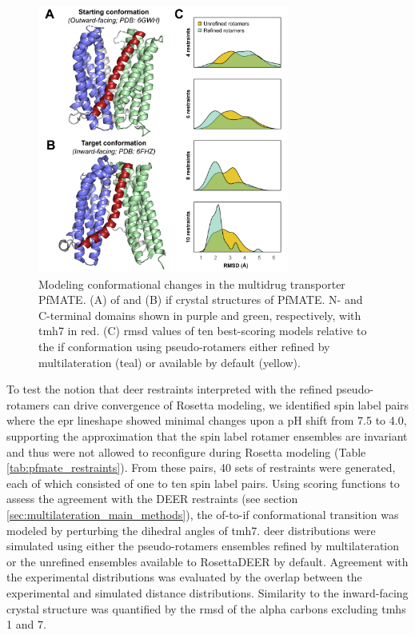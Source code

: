 \begin{figure}
\centering
\includegraphics[width=3.25in]{Figures/multilateration_main_rmsd.pdf}
 \caption[Modeling conformational changes in the multidrug transporter PfMATE.]{Modeling conformational changes in the multidrug transporter PfMATE. (A) \Gls{of} and (B) \gls{if} crystal structures of PfMATE. N- and C-terminal domains shown in purple and green, respectively, with \gls{tmh}7 in red. (C) \Gls{rmsd} values of ten best-scoring models relative to the \gls{if} conformation using pseudo-rotamers either refined by multilateration (teal) or available by default (yellow).}
\label{fig:multilateration_main_rmsd}
\end{figure}

To test the notion that \gls{deer} restraints interpreted with the refined pseudo-rotamers can drive convergence of Rosetta modeling, we identified spin label pairs where the \gls{epr} lineshape showed minimal changes upon a pH shift from 7.5 to 4.0, supporting the approximation that the spin label rotamer ensembles are invariant and thus were not allowed to reconfigure during Rosetta modeling (Table \ref{tab:pfmate_restraints}). From these pairs, 40 sets of restraints were generated, each of which consisted of one to ten spin label pairs. Using scoring functions to assess the agreement with the DEER restraints (see section \ref{sec:multilateration_main_methods}), the \gls{of}-to-\gls{if} conformational transition was modeled by perturbing the dihedral angles of \gls{tmh}7. \Gls{deer} distributions were simulated using either the pseudo-rotamers ensembles refined by multilateration or the unrefined ensembles available to RosettaDEER by default. Agreement with the experimental distributions was evaluated by the overlap between the experimental and simulated distance distributions. Similarity to the inward-facing crystal structure was quantified by the \gls{rmsd} of the alpha carbons excluding \gls{tmh}s 1 and 7.


